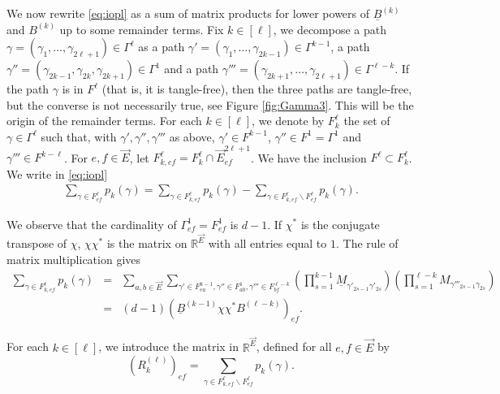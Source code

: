 \documentclass[11pt]{article}
\newcommand{\dR}{\mathbb {R}}
\newcommand{\PAR}[1]{{{\left(#1\right)}}} %
\newcommand{\uB}{{\underline B}}
\newcommand{\1}{1\!\!{\sf I}}\newcommand{\IND}{\1}
\begin{document}
\vspace{-10pt}


We now rewrite \eqref{eq:iopl} as a sum of matrix products for lower powers of $\uB^{(k)}$ and $B^{(k)}$ up to some remainder terms.  Fix $k \in [\ell]$, we decompose a path $\gamma  = (\gamma_1, \ldots, \gamma_{2\ell +1} ) \in \Gamma^{\ell}$ as a path $\gamma'=  (\gamma_1, \ldots, \gamma_{2k -1} ) \in  \Gamma ^{k-1}$, a path $\gamma''= (\gamma_{2k-1}, \gamma_{2k} , \gamma_{2k+1} ) \in \Gamma^{1}$ and a path $\gamma''' = (\gamma_{2k+1}, \ldots, \gamma_{2 \ell +1}) \in \Gamma^{\ell - k}$. If the path $\gamma$ is in $F^{\ell}$ (that is, it is tangle-free), then  the three paths are tangle-free, but the converse is not necessarily true, see Figure \ref{fig:Gamma3}. This will be the origin of the remainder terms.  For each $k\in [\ell]$, we denote by $F^{\ell}_{k}$ the set of $\gamma \in \Gamma^{\ell}$ such that, with $\gamma', \gamma'', \gamma'''$ as above, $\gamma'  \in F^{k-1}$, $\gamma'' \in F^{1} = \Gamma^1$ and $\gamma''' \in F^{k-\ell}$. For $e,f \in \vec E$, let $F^\ell_{k,ef} = F^\ell_{k} \cap \vec E^{2\ell+1}_{ef}$. We have the inclusion $F^{\ell}  \subset F^{\ell}_{k}$. We write in \eqref{eq:iopl}
\begin{eqnarray*}
\sum_{\gamma \in F^{\ell} _{e f}}   p_k(\gamma)  = \sum_{\gamma \in F^{\ell} _{k,e f}} p_k(\gamma) - \sum_{\gamma \in F^{\ell} _{k,e f} \backslash F^{\ell} _{e f}}  p_k(\gamma).
\end{eqnarray*}

We observe that the cardinality of $\Gamma^1_{ef} = F^1_{ef}$ is $d-1$. If $\chi^*$ is the conjugate transpose of $\chi$, $\chi \chi^*$ is the matrix on $\dR^{\vec E}$ with all entries equal to $1$. The rule of matrix multiplication gives 
\begin{eqnarray*}
 \sum_{\gamma \in F^{\ell} _{k,e f}}  p_k(\gamma) & = &  \sum_{a,b \in \vec E} \sum_{\gamma'\in F^{k-1}_{ea}, \gamma'' \in  F^{1}_{ab}, \gamma'''\in F^{\ell-k}_{bf} }  \PAR{ \prod_{s=1}^{k-1} \underline M_{\gamma'_{2s-1} \gamma'_{2s}}}  \PAR{\prod_{s = 1}^{\ell-k} M_{\gamma'''_{2s-1} \gamma_{2s}}} \\
 & = & (d-1)( \uB^{(k-1)} \chi \chi^*  B^{(\ell - k)} )_{ef}. 
\end{eqnarray*}


For each $k \in [\ell]$, we introduce the matrix in $\dR^{\vec E}$, defined for all $e,f \in \vec E$ by 
\begin{equation}\label{eq:defR}
(R^{(\ell)}_{k} )_{ef}   =  \sum_{\gamma \in F^{\ell} _{k,e f} \backslash F^{\ell} _{e f}} p_k(\gamma).
\end{equation}
\end{document}

